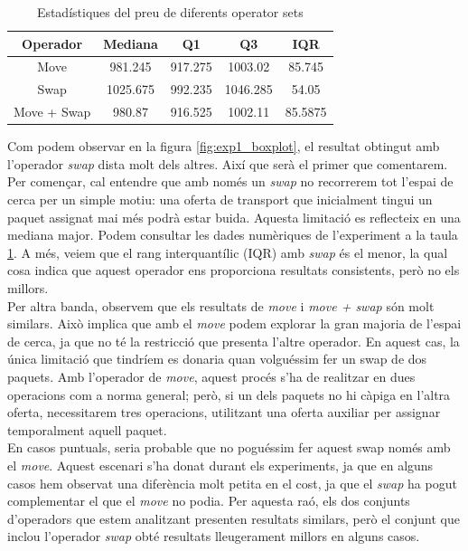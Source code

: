 \documentclass[a4paper]{article}
\begin{document}
	\begin{table}[H]
		\centering
		\begin{tabular}{|c|c|c|c|c|}
			\hline
			\textbf{Operador} & \textbf{Mediana} & \textbf{Q1} & \textbf{Q3} & \textbf{IQR} \\
			\hline
			Move & 981.245 & 917.275 & 1003.02 & 85.745 \\
			\hline
			Swap & 1025.675 & 992.235 & 1046.285 & 54.05 \\
			\hline
			Move + Swap & 980.87 & 916.525 & 1002.11 & 85.5875\\
			\hline
		\end{tabular}
		\caption{Estadístiques del preu de diferents operator sets}
		\label{tab:exp1_estadisticas}
	\end{table}
	
	Com podem observar en la figura \ref{fig:exp1_boxplot}, el resultat obtingut amb l'operador \textit{swap} dista molt dels altres. Així que serà el primer que comentarem. Per començar, cal entendre que amb només un \textit{swap} no recorrerem tot l'espai de cerca per un simple motiu: una oferta de transport que inicialment tingui un paquet assignat mai més podrà estar buida. Aquesta limitació es reflecteix en una mediana major. Podem consultar les dades numèriques de l'experiment a la taula \ref{tab:exp1_estadisticas}. A més, veiem que el rang interquantílic (IQR) amb \textit{swap} és el menor, la qual cosa indica que aquest operador ens proporciona resultats consistents, però no els millors. \\
	
	Per altra banda, observem que els resultats de \textit{move} i \textit{move + swap} són molt similars. Això implica que amb el \textit{move} podem explorar la gran majoria de l'espai de cerca, ja que no té la restricció que presenta l'altre operador. En aquest cas, la única limitació que tindríem es donaria quan volguéssim fer un swap de dos paquets. Amb l'operador de \textit{move}, aquest procés s'ha de realitzar en dues operacions com a norma general; però, si un dels paquets no hi càpiga en l'altra oferta, necessitarem tres operacions, utilitzant una oferta auxiliar per assignar temporalment aquell paquet. \\
	
	En casos puntuals, seria probable que no poguéssim fer aquest swap només amb el \textit{move}. Aquest escenari s'ha donat durant els experiments, ja que en alguns casos hem observat una diferència molt petita en el cost, ja que el \textit{swap} ha pogut complementar el que el \textit{move} no podia. Per aquesta raó, els dos conjunts d'operadors que estem analitzant presenten resultats similars, però el conjunt que inclou l'operador \textit{swap} obté resultats lleugerament millors en alguns casos. \\
	
\end{document}
